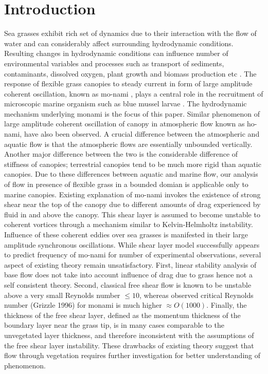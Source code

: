 \documentclass[aps,prl,twocolumn,showpacs,superscriptaddress,groupedaddress,10pt]{revtex4-1}  %
\begin{document}
\section{Introduction}
Sea grasses exhibit rich set of dynamics due to their interaction with the flow of water and can considerably affect surrounding hydrodynamic conditions.
Resulting changes in hydrodynamic conditions can influence number of environmental variables and processes such as 
transport of sediments, contaminants, dissolved oxygen, plant growth and biomass production etc \cite{Fonseca87,Nepf99}. 
The response of flexible grass canopies to steady current in form of large amplitude coherent oscillation, known as mo-nami \cite{AckermanOkubo93}, plays a central role
in the recruitment of microscopic marine organism such as blue mussel larvae \cite{Grizzle96}. The hydrodynamic mechanism underlying monami is the focus of this paper. 
\newline
Similar phenomenon of large amplitude coherent oscillation of canopy in atmospheric flow known as ho-nami\cite{Inoue56,Raupach96}, have also been observed.
A crucial difference between the atmospheric and aquatic flow is that the atmospheric flows are essentially unbounded vertically. Another major
difference between the two is the considerable difference of stiffness of canopies; terrestrial canopies tend to be much more rigid than aquatic canopies.
Due to these differences between aquatic and marine flow, our analysis of flow in presence of flexible grass in a bounded domian is applicable only to marine canopies. 
\newline   
Existing explanation of mo-nami invokes the existence of strong shear near the top of the canopy \cite{Ghisal02,Raupach96} due to
different amounts of drag experienced by fluid in and above the canopy. This shear layer is assumed to become unstable to coherent vortices through a mechanism similar to 
Kelvin-Helmholtz instability. Influence of these coherent eddies over sea grasses is manifested in their large amplitude synchronous oscillations.
\newline
While shear layer model successfully appears to predict frequency of mo-nami for number of experimental observations,
several aspect of existing theory remain unsatisfactory. First, linear stability analysis of base flow does not take into account influence of drag due to grass hence not a self 
consistent theory. Second, classical free shear flow is known to be unstable above a very small Reynolds number $\leq 10 $, whereas observed critical 
Reynolds number\cite{Grizzle96} (Grizzle 1996) for monami is much higher $\approx O(1000)$. Finally, the thickness of the free shear layer, defined as the momentum thickness of the boundary layer near the grass tip, is in many cases comparable to the unvegetated layer thickness, and therefore inconsistent with the assumptions of the free shear layer instability. These drawbacks of existing theory suggest that flow through vegetation requires further investigation for better understanding of phenomenon.
\end{document}
